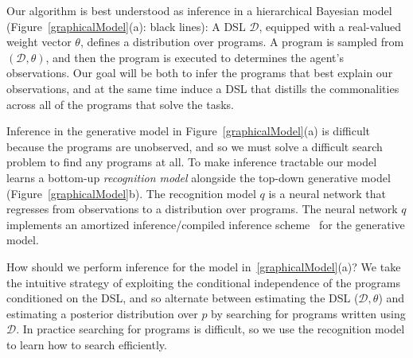 \documentclass{article}
\begin{document}
Our algorithm is best understood as inference in a hierarchical Bayesian model (Figure~\ref{graphicalModel}(a): black lines):
A DSL $\mathcal{D}$, equipped with a real-valued weight vector $\theta$,
defines a distribution over programs.
A program is sampled from $(\mathcal{D},\theta)$,
and then the program is executed to determines the agent's observations.
Our goal will be both to infer the programs that best explain our observations,
and at the same time induce a DSL
that distills the commonalities across all of the programs that solve the tasks.

Inference in the generative model in Figure~\ref{graphicalModel}(a) is
difficult because the programs are unobserved, and so we must solve a
difficult search problem to find any programs at all. To make
inference tractable our model learns a bottom-up \emph{recognition
  model} alongside the top-down generative model
(Figure~\ref{graphicalModel}b).  The recognition model $q$ is a neural
network that regresses from observations to a distribution over
programs.  The neural network $q$ implements an amortized
inference/compiled inference
scheme~\cite{le2016inference,ritchie2016deep} for the generative
model.

How should we perform inference for the model
in~\ref{graphicalModel}(a)?  We take the intuitive strategy of exploiting the
conditional independence of the programs conditioned on the DSL, and
so alternate between estimating the DSL ($\mathcal{D},\theta$) and
estimating a posterior distribution over $p$ by searching for
programs written using $\mathcal{D}$.  In practice searching for
programs is difficult, so we use the recognition model to
learn how to search efficiently.
\end{document}
